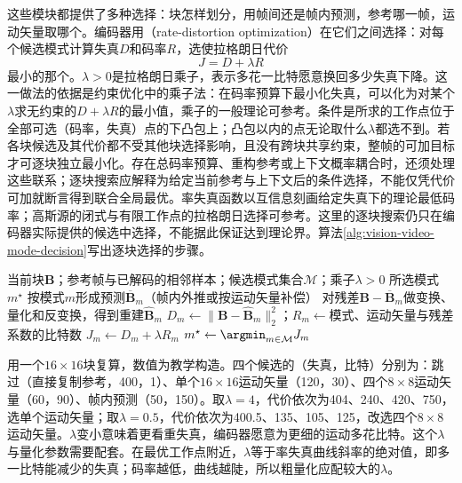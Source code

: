 这些模块都提供了多种选择：块怎样划分，用帧间还是帧内预测，参考哪一帧，运动矢量取哪个。编码器用（rate-distortion optimization）在它们之间选择：对每个候选模式计算失真$D$和码率$R$，选使拉格朗日代价
\begin{equation}
  J=D+\lambda R
  \label{eq:vision-video-lagrangian}
\end{equation}
最小的那个。$\lambda>0$是拉格朗日乘子，表示多花一比特愿意换回多少失真下降。这一做法的依据是约束优化中的乘子法：在码率预算下最小化失真，可以化为对某个$\lambda$求无约束的$D+\lambda R$的最小值，乘子的一般理论可参考。条件是所求的工作点位于全部可选（码率，失真）点的下凸包上；凸包以内的点无论取什么$\lambda$都选不到。若各块候选及其代价都不受其他块选择影响，且没有跨块共享约束，整帧的可加目标才可逐块独立最小化。存在总码率预算、重构参考或上下文概率耦合时，还须处理这些联系；逐块搜索应解释为给定当前参考与上下文后的条件选择，不能仅凭代价可加就断言得到联合全局最优。率失真函数以互信息刻画给定失真下的理论最低码率；高斯源的闭式与有限工作点的拉格朗日选择可参考。这里的逐块搜索仍只在编码器实际提供的候选中选择，不能据此保证达到理论界。算法\ref{alg:vision-video-mode-decision}写出逐块选择的步骤。

\begin{algorithm}[基于拉格朗日代价的块模式选择]
  \label{alg:vision-video-mode-decision}
  \begin{algorithmic}[1]
    \Require 当前块$\bm{B}$；参考帧与已解码的相邻样本；候选模式集合$\mathcal{M}$；乘子$\lambda>0$
    \Ensure 所选模式$m^\star$
      \State 按模式$m$形成预测$\overline{\bm{B}}_m$（帧内外推或按运动矢量补偿）
      \State 对残差$\bm{B}-\overline{\bm{B}}_m$做变换、量化和反变换，得到重建$\widehat{\bm{B}}_m$
      \State $D_m\gets\lVert\bm{B}-\widehat{\bm{B}}_m\rVert_2^2$；$R_m\gets$模式、运动矢量与残差系数的比特数
      \State $J_m\gets D_m+\lambda R_m$
    \EndFor
    \State $m^\star\gets\argmin_{m\in\mathcal{M}}J_m$
  \end{algorithmic}
\end{algorithm}

用一个$16\times16$块复算，数值为教学构造。四个候选的（失真，比特）分别为：跳过（直接复制参考，400，1）、单个$16\times16$运动矢量（120，30）、四个$8\times8$运动矢量（60，90）、帧内预测（50，150）。取$\lambda=4$，代价依次为404、240、420、750，选单个运动矢量；取$\lambda=0.5$，代价依次为400.5、135、105、125，改选四个$8\times8$运动矢量。$\lambda$变小意味着更看重失真，编码器愿意为更细的运动多花比特。这个$\lambda$与量化参数需要配套。在最优工作点附近，$\lambda$等于率失真曲线斜率的绝对值，即多一比特能减少的失真；码率越低，曲线越陡，所以粗量化应配较大的$\lambda$。

